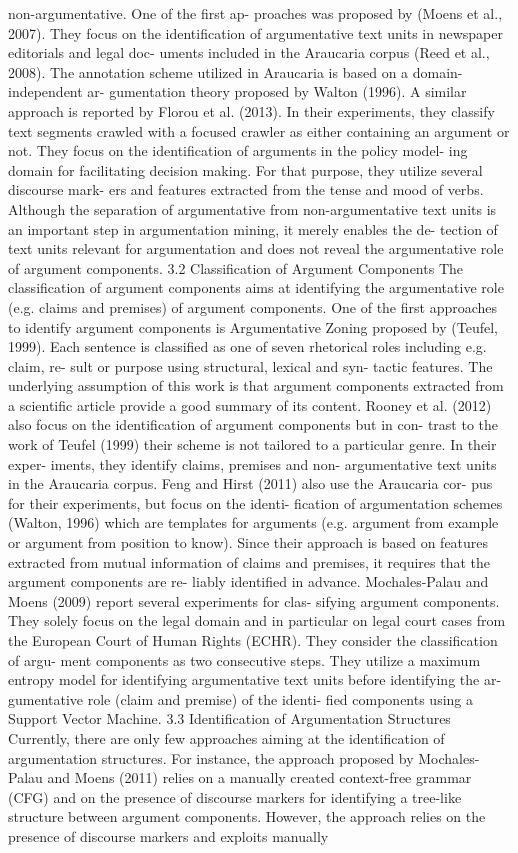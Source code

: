 non-argumentative. One of the first ap- proaches was proposed by (Moens et al., 2007). They focus on the identification of argumentative text units in newspaper editorials and legal doc- uments included in the Araucaria corpus (Reed et al., 2008). The annotation scheme utilized in Araucaria is based on a domain-independent ar- gumentation theory proposed by Walton (1996). A similar approach is reported by Florou et al. (2013). In their experiments, they classify text segments crawled with a focused crawler as either containing an argument or not. They focus on the identification of arguments in the policy model- ing domain for facilitating decision making. For that purpose, they utilize several discourse mark- ers and features extracted from the tense and mood of verbs. Although the separation of argumentative from non-argumentative text units is an important step in argumentation mining, it merely enables the de- tection of text units relevant for argumentation and does not reveal the argumentative role of argument components. 3.2 Classification of Argument Components The classification of argument components aims at identifying the argumentative role (e.g. claims and premises) of argument components. One of the first approaches to identify argument components is Argumentative Zoning proposed by (Teufel, 1999). Each sentence is classified as one of seven rhetorical roles including e.g. claim, re- sult or purpose using structural, lexical and syn- tactic features. The underlying assumption of this work is that argument components extracted from a scientific article provide a good summary of its content. Rooney et al. (2012) also focus on the identification of argument components but in con- trast to the work of Teufel (1999) their scheme is not tailored to a particular genre. In their exper- iments, they identify claims, premises and non- argumentative text units in the Araucaria corpus. Feng and Hirst (2011) also use the Araucaria cor- pus for their experiments, but focus on the identi- fication of argumentation schemes (Walton, 1996) which are templates for arguments (e.g. argument from example or argument from position to know). Since their approach is based on features extracted from mutual information of claims and premises, it requires that the argument components are re- liably identified in advance. Mochales-Palau and Moens (2009) report several experiments for clas- sifying argument components. They solely focus on the legal domain and in particular on legal court cases from the European Court of Human Rights (ECHR). They consider the classification of argu- ment components as two consecutive steps. They utilize a maximum entropy model for identifying argumentative text units before identifying the ar- gumentative role (claim and premise) of the identi- fied components using a Support Vector Machine. 3.3 Identification of Argumentation Structures Currently, there are only few approaches aiming at the identification of argumentation structures. For instance, the approach proposed by Mochales- Palau and Moens (2011) relies on a manually created context-free grammar (CFG) and on the presence of discourse markers for identifying a tree-like structure between argument components. However, the approach relies on the presence of discourse markers and exploits manually 